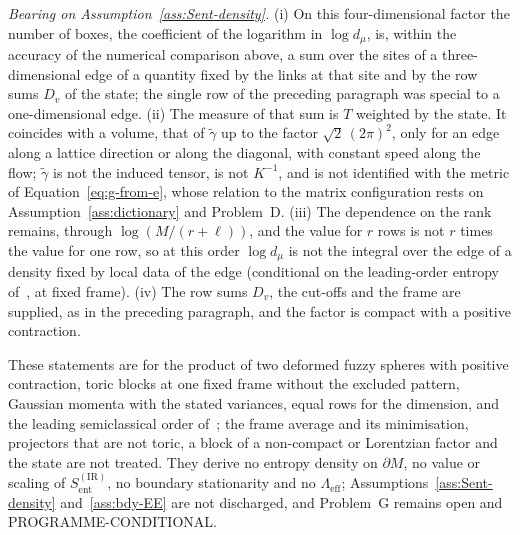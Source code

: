 \emph{Bearing on Assumption~\ref{ass:Sent-density}.} (i) On this four-dimensional factor the number of boxes, the coefficient of the logarithm in \(\log d_\mu\), is, within the accuracy of the numerical comparison above, a sum over the sites of a three-dimensional edge of a quantity fixed by the links at that site and by the row sums \(D_v\) of the state; the single row of the preceding paragraph was special to a one-dimensional edge. (ii) The measure of that sum is \(T\) weighted by the state. It coincides with a volume, that of \(\tilde\gamma\) up to the factor \(\sqrt2\,(2\pi)^2\), only for an edge along a lattice direction or along the diagonal, with constant speed along the flow; \(\tilde\gamma\) is not the induced tensor, is not \(K^{-1}\), and is not identified with the metric of Equation~\eqref{eq:g-from-e}, whose relation to the matrix configuration rests on Assumption~\ref{ass:dictionary} and Problem~D. (iii) The dependence on the rank remains, through \(\log(M/(r+\ell))\), and the value for \(r\) rows is not \(r\) times the value for one row, so at this order \(\log d_\mu\) is not the integral over the edge of a density fixed by local data of the edge (conditional on the leading-order entropy of~\cite{FlissFrenkelHartnollSoni2025}, at fixed frame). (iv) The row sums \(D_v\), the cut-offs and the frame are supplied, as in the preceding paragraph, and the factor is compact with a positive contraction.

These statements are for the product of two deformed fuzzy spheres with positive contraction, toric blocks at one fixed frame without the excluded pattern, Gaussian momenta with the stated variances, equal rows for the dimension, and the leading semiclassical order of~\cite{FlissFrenkelHartnollSoni2025}; the frame average and its minimisation, projectors that are not toric, a block of a non-compact or Lorentzian factor and the state are not treated. They derive no entropy density on \(\partial M\), no value or scaling of \(S_{\mathrm{ent}}^{\mathrm{(IR)}}\), no boundary stationarity and no \(\Lambda_{\mathrm{eff}}\); Assumptions~\ref{ass:Sent-density} and~\ref{ass:bdy-EE} are not discharged, and Problem~G remains open and PROGRAMME-CONDITIONAL.
